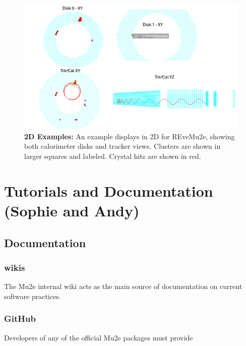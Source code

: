  \begin{figure}[htb]
\begin{center}
\includegraphics[width=0.9\linewidth]{figures/2D-REve-all.png}
\caption{\textbf{2D Examples: }An example displays in 2D for REveMu2e, showing both calorimeter disks and tracker views. Clusters are shown in larger squares and labeled. Crystal hits are shown in red. }
\label{fig:teve_2d_all}
\end{center}
\end{figure}



\section{Tutorials and Documentation (Sophie and Andy) }
\label{sec:tutorial}


\subsection{Documentation}

\subsubsection{wikis}

The Mu2e internal wiki acts as the main source of documentation on current software practices. 

\subsubsection{GitHub}

Developers of any of the official Mu2e packages must provide 
